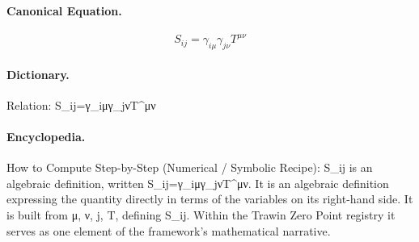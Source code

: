 \paragraph{Canonical Equation.}
\[
S_{ij}=\gamma_{i\mu}\gamma_{j\nu}T^{\mu\nu}
\]

\paragraph{Dictionary.}
Relation: S\_ij=γ\_iμγ\_jνT\textasciicircum{}μν

\paragraph{Encyclopedia.}
How to Compute Step-by-Step (Numerical / Symbolic Recipe): S\_ij is an algebraic definition, written S\_ij=γ\_iμγ\_jνT\textasciicircum{}μν. It is an algebraic definition expressing the quantity directly in terms of the variables on its right-hand side. It is built from μ, ν, j, T, defining S\_ij. Within the Trawin Zero Point registry it serves as one element of the framework's mathematical narrative.
